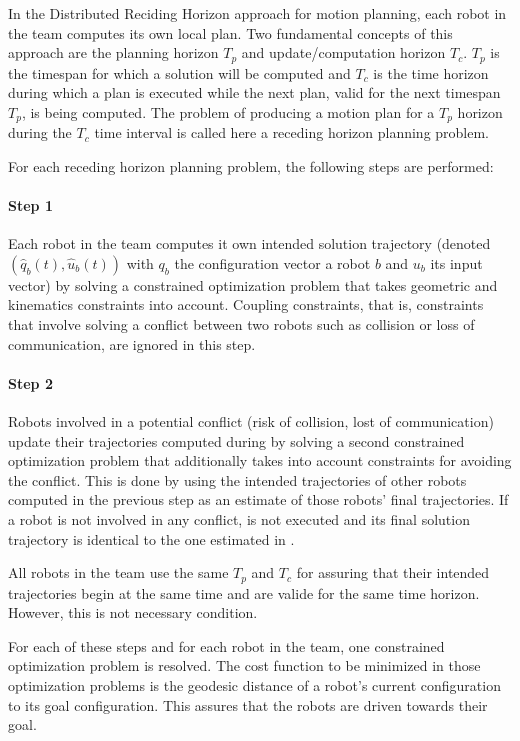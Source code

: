 \documentclass[letterpaper, 10 pt, conference]{ieeeconf}  %
\begin{document}
In the Distributed Reciding Horizon approach for motion planning, each robot in the team computes its own local plan. Two fundamental concepts of this approach are the planning horizon $T_p$ and update/computation horizon $T_c$. $T_p$ is the timespan for which a solution will be computed and $T_c$ is the time horizon during which a plan is executed while the next plan, valid for the next timespan $T_p$, is being computed. The problem of producing a motion plan for a $T_p$ horizon during the $T_c$ time interval is called
here a receding horizon planning problem.

For each receding horizon planning problem, the following steps are performed:
\paragraph*{Step 1}\label{step1} Each robot in the team computes it own intended solution trajectory (denoted $(\hat{q}_b(t), \hat{u}_b(t))$ with $q_b$ the configuration vector a robot $b$ and $u_b$ its input vector) by solving a constrained optimization problem that takes geometric and kinematics constraints into account. Coupling constraints, that is, constraints that involve solving a conflict between two robots such as collision or loss of communication, are ignored in this step.
\paragraph*{Step 2}\label{step2} Robots involved in a potential conflict (risk of collision, lost of communication) update their trajectories computed during  by solving a second constrained optimization problem that additionally takes into account constraints for avoiding the conflict. This is done by using the intended trajectories of other robots computed in the previous step as an estimate of those robots' final trajectories. If a robot is not involved in any conflict,  is not executed and its final solution trajectory is identical to the one estimated in .

All robots in the team use the same $T_p$ and $T_c$ for assuring that their intended trajectories begin at the same time and are valide for the same time horizon. However, this is not necessary condition.

For each of these steps and for each robot in the team, one constrained optimization problem is resolved. The cost function to be minimized in those optimization problems is the geodesic distance of a robot's current configuration to its goal configuration. This assures that the robots are driven towards their goal.
\end{document}
